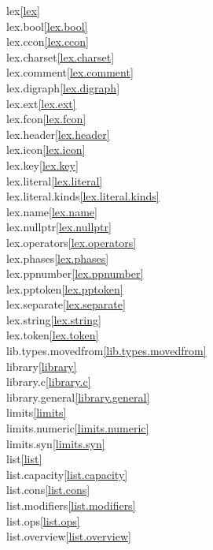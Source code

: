 \begin{multicols}{2}
lex\quad\ref{lex}\\
lex.bool\quad\ref{lex.bool}\\
lex.ccon\quad\ref{lex.ccon}\\
lex.charset\quad\ref{lex.charset}\\
lex.comment\quad\ref{lex.comment}\\
lex.digraph\quad\ref{lex.digraph}\\
lex.ext\quad\ref{lex.ext}\\
lex.fcon\quad\ref{lex.fcon}\\
lex.header\quad\ref{lex.header}\\
lex.icon\quad\ref{lex.icon}\\
lex.key\quad\ref{lex.key}\\
lex.literal\quad\ref{lex.literal}\\
lex.literal.kinds\quad\ref{lex.literal.kinds}\\
lex.name\quad\ref{lex.name}\\
lex.nullptr\quad\ref{lex.nullptr}\\
lex.operators\quad\ref{lex.operators}\\
lex.phases\quad\ref{lex.phases}\\
lex.ppnumber\quad\ref{lex.ppnumber}\\
lex.pptoken\quad\ref{lex.pptoken}\\
lex.separate\quad\ref{lex.separate}\\
lex.string\quad\ref{lex.string}\\
lex.token\quad\ref{lex.token}\\
lib.types.movedfrom\quad\ref{lib.types.movedfrom}\\
library\quad\ref{library}\\
library.c\quad\ref{library.c}\\
library.general\quad\ref{library.general}\\
limits\quad\ref{limits}\\
limits.numeric\quad\ref{limits.numeric}\\
limits.syn\quad\ref{limits.syn}\\
list\quad\ref{list}\\
list.capacity\quad\ref{list.capacity}\\
list.cons\quad\ref{list.cons}\\
list.modifiers\quad\ref{list.modifiers}\\
list.ops\quad\ref{list.ops}\\
list.overview\quad\ref{list.overview}\\

\end{multicols}
